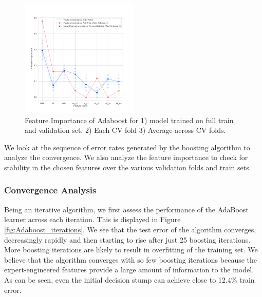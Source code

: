 \documentclass[11pt, letterpaper, journal]{IEEEtran}
\begin{document}
\begin{figure}[h]
    \centering
    \includegraphics[width=0.5\textwidth]{statics/Feature_importance_test_scheme1_tr_23_te_1.png}
    \caption{Feature Importance of Adaboost for 1) model trained on full train and validation set. 2) Each CV fold 3) Average across CV folds.}
    \label{fig:Feature_importance ts1}
\end{figure}

We look at the sequence of error rates generated by the boosting algorithm to analyze the convergence. We also analyze the feature importance to check for stability in the chosen features over the various validation folds and train sets.

\subsubsection{Convergence Analysis}
Being an iterative algorithm, we first assess the performance of the AdaBoost learner across each iteration. This is displayed in Figure \ref{fig:Adaboost_iterations}. We see that the test error of the algorithm converges, decreasingly rapidly and then starting to rise after just 25 boosting iterations. More boosting iterations are likely to result in overfitting of the training set. We believe that the algorithm converges with so few boosting iterations because the expert-engineered features provide a large amount of information to the model. As can be seen, even the initial decision stump can achieve close to 12.4\% train error.
\end{document}
